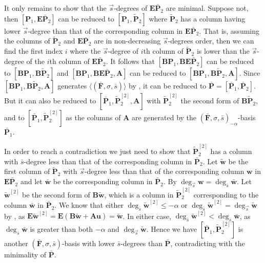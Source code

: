 \begin{pf}
It only remains to show that the $\vec{s}$-degrees of $\mathbf{E}\bar{\mathbf{P}}_{2}$
are minimal. Suppose not, then $[\mathbf{P}_{1},\mathbf{E}\bar{\mathbf{P}}_{2}]$
can be reduced to $[\mathbf{P}_{1},\tilde{\mathbf{P}}_{2}]$ where
$\tilde{\mathbf{P}}_{2}$ has a column having lower $\vec{s}$-degree
than that of the corresponding column in $\mathbf{E}\bar{\mathbf{P}}_{2}$.
That is, assuming the columns of $\tilde{\mathbf{P}}_{2}$ and $\mathbf{E}\bar{\mathbf{P}}_{2}$
are in non-decreasing $\vec{s}$-degrees order, then we can find the
first index $i$ where the $\vec{s}$-degree of $i$th column of $\tilde{\mathbf{P}}_{2}$
is lower than the $\vec{s}$-degree of the $i$th column of $\mathbf{E}\bar{\mathbf{P}}_{2}$.
It follows that $[\mathbf{B}\mathbf{P}_{1},\mathbf{B}\mathbf{E}\bar{\mathbf{P}}_{2}]$
can be reduced to $[\mathbf{B}\mathbf{P}_{1},\mathbf{B}\tilde{\mathbf{P}}_{2}]$
and $[\mathbf{B}\mathbf{P}_{1},\mathbf{B}\mathbf{E}\bar{\mathbf{P}}_{2},\mathbf{A}]$
can be reduced to $[\mathbf{B}\mathbf{P}_{1},\mathbf{B}\tilde{\mathbf{P}}_{2},\mathbf{A}]$.
Since $[\mathbf{B}\mathbf{P}_{1},\mathbf{B}\tilde{\mathbf{P}}_{2},\mathbf{A}]$
generates $\langle(\bar{\mathbf{F}},\sigma,\bar{s})\rangle$ by ,
it can be reduced to $\bar{\mathbf{P}}=[\bar{\mathbf{P}}_{1},\bar{\mathbf{P}}_{2}]$.
But it can also be reduced to $[\bar{\mathbf{P}}_{1},\tilde{\mathbf{P}}_{2}^{[2]},\mathbf{A}]$
with $\tilde{\mathbf{P}}_{2}^{[2]}$ the second form of $\mathbf{B}\tilde{\mathbf{P}}_{2}$,
and to $[\bar{\mathbf{P}}_{1},\tilde{\mathbf{P}}_{2}^{[2]}]$ as the
columns of $\mathbf{A}$ are generated by the $\left(\bar{\mathbf{F}},\sigma,\bar{s}\right)_{-\alpha}$-basis
$\bar{\mathbf{P}}_{1}$.

In order to reach a contradiction we just need to show that $\tilde{\mathbf{P}}_{2}^{[2]}$
has a column with $\bar{s}$-degree less than that of the corresponding
column in $\bar{\mathbf{P}}_{2}$. Let $\tilde{\mathbf{w}}$ be the
first column of $\tilde{\mathbf{P}}_{2}$ with $\vec{s}$-degree less
than that of the corresponding column $\mathbf{w}$ in $\mathbf{E}\bar{\mathbf{P}}_{2}$
and let $\bar{\mathbf{w}}$ be the corresponding column in $\bar{\mathbf{P}}_{2}$.
By  $\deg_{\vec{s}}\mathbf{w}=\deg_{\bar{s}}\bar{\mathbf{w}}$.
Let $\tilde{\mathbf{w}}^{[2]}$ be the second form of $\mathbf{B}\tilde{\mathbf{w}}$,
which is a column in $\tilde{\mathbf{P}}_{2}^{[2]}$ corresponding
to the column $\bar{\mathbf{w}}$ in $\bar{\mathbf{P}}_{2}$. We know
that either $\deg_{\bar{s}}\tilde{\mathbf{w}}^{[2]}\le-\alpha$ or
$\deg_{\bar{s}}\tilde{\mathbf{w}}^{[2]}=\deg_{\vec{s}}\tilde{\mathbf{w}}$
by , as $\mathbf{E}\tilde{\mathbf{w}}^{[2]}=\mathbf{E}(\mathbf{B}\tilde{\mathbf{w}}+\mathbf{A}\mathbf{u})=\tilde{\mathbf{w}}$.
In either case, $\deg_{\bar{s}}\tilde{\mathbf{w}}^{[2]}<\deg_{\bar{s}}\bar{\mathbf{w}}$,
as $\deg_{\bar{s}}\bar{\mathbf{w}}$ is greater than both $-\alpha$
and $\deg_{\vec{s}}\tilde{\mathbf{w}}$. Hence we have $[\bar{\mathbf{P}}_{1},\tilde{\mathbf{P}}_{2}^{[2]}]$
is another $\left(\bar{\mathbf{F}},\sigma,\bar{s}\right)$-basis with
lower $\bar{s}$-degrees than $\mathbf{\bar{P}}$, contradicting with
the minimality of $\bar{\mathbf{P}}$. 
\end{pf}

